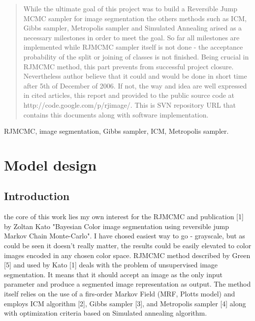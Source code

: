 \documentclass[journal]{IEEEtran}
\begin{document}
\maketitle


\begin{abstract}
While the ultimate goal of this project was to build a Reversible Jump MCMC sampler for image segmentation the others methods such as ICM, Gibbs sampler, Metropolis sampler and Simulated Annealing arised as a necessary milestones in order to meet the goal. So far all milestones are implemented while RJMCMC sampler itself is not done - the acceptance probability of the split or joining of classes is not finished. Being crucial in RJMCMC method, this part prevents from successful project closure. Nevertheless author believe that it could and would be done in short time after 5th of December of 2006. If not, the way and idea are well expressed in cited articles, this report and provided to the public source code at http://code.google.com/p/rjimage/. This is SVN repository URL that contains this documents along with software implementation.
\end{abstract}

\begin{keywords}
RJMCMC, image segmentation, Gibbs sampler, ICM, Metropolis sampler.
\end{keywords}

%
\IEEEpeerreviewmaketitle


\section{Model design}
\subsection{Introduction}
 the core of this work lies my own interest for the RJMCMC and publication [1] by Zoltan Kato "Bayesian Color image segmentation using reversible jump Markov Chain Monte-Carlo". I have chosed easiest way to go - grayscale, but as could be seen it doesn't really matter, the results could be easily elevated to color images encoded in any chosen color space. RJMCMC method described by Green [5] and used by Kato [1] deals with the problem of unsupervised image segmentation. It means that it should accept an image as the only input parameter and produce a segmented image representation as output. The method itself relies on the use of a firs-order Markov Field (MRF, Plotts model) and employs ICM algorithm [2], Gibbs sampler [3], and Metropolis sampler [4] along with optimization criteria based on Simulated annealing algorithm.
\end{document}
